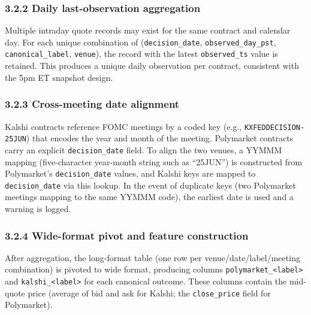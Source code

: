 \subsubsection*{3.2.2 Daily last-observation aggregation}

Multiple intraday quote records may exist for the same contract and calendar day. For each unique combination of (\texttt{decision\_date}, \texttt{observed\_day\_pst}, \texttt{canonical\_label}, \texttt{venue}), the record with the latest \texttt{observed\_ts} value is retained. This produces a unique daily observation per contract, consistent with the 5pm ET snapshot design.

\subsubsection*{3.2.3 Cross-meeting date alignment}

Kalshi contracts reference FOMC meetings by a coded key (e.g., \texttt{KXFEDDECISION-25JUN}) that encodes the year and month of the meeting. Polymarket contracts carry an explicit \texttt{decision\_date} field. To align the two venues, a YYMMM mapping (five-character year-month string such as ``25JUN'') is constructed from Polymarket's \texttt{decision\_date} values, and Kalshi keys are mapped to \texttt{decision\_date} via this lookup. In the event of duplicate keys (two Polymarket meetings mapping to the same YYMMM code), the earliest date is used and a warning is logged.

\subsubsection*{3.2.4 Wide-format pivot and feature construction}

After aggregation, the long-format table (one row per venue/date/label/meeting combination) is pivoted to wide format, producing columns \texttt{polymarket\_<label>} and \texttt{kalshi\_<label>} for each canonical outcome. These columns contain the mid-quote price (average of bid and ask for Kalshi; the \texttt{close\_price} field for Polymarket).

